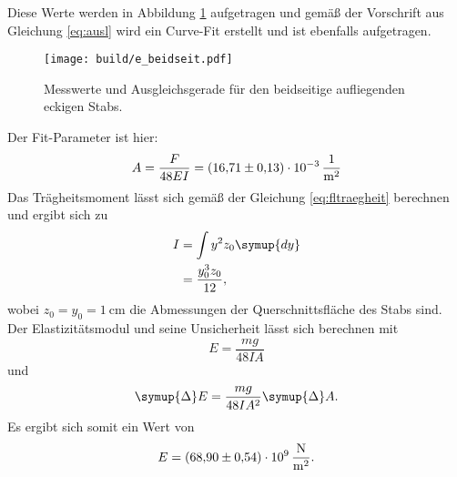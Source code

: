 \noindent Diese Werte werden in Abbildung \ref{fig:plot3} aufgetragen und gemäß der Vorschrift aus Gleichung \eqref{eq:ausl}
wird ein Curve-Fit erstellt und ist ebenfalls aufgetragen.
\begin{figure}[H]
    \centering
    \texttt{[image: build/e\_beidseit.pdf]}
    \caption{Messwerte und Ausgleichsgerade für den beidseitige aufliegenden eckigen Stabs.}
    \label{fig:plot3}
\end{figure}
\noindent Der Fit-Parameter ist hier:
\begin{equation}
    A = \frac{F}{48EI} = \SI{16.71\pm0.13e-3}{\per\meter\squared}
\end{equation}
Das Trägheitsmoment lässt sich gemäß der Gleichung \eqref{eq:fltraegheit} berechnen und ergibt sich zu
\begin{align}
    I &= \int y^2z_0 \symup{dy} \\
      &= \frac{y_0^3z_0}{12},
\end{align}
wobei $z_0=y_0=\SI{1}{\centi\meter}$ die Abmessungen der Querschnittsfläche des Stabs sind.
Der Elastizitätsmodul und seine Unsicherheit lässt sich berechnen mit
\begin{equation}
    E=\frac{mg}{48IA}
\end{equation}
und
\begin{equation}
    \symup{\Delta}E=\frac{mg}{48IA^2}\symup{\Delta}A.
\end{equation}
Es ergibt sich somit ein Wert von
\begin{equation}
    E = \SI{68.90\pm0.54e9}{\newton\per\meter\squared}.
\end{equation}
